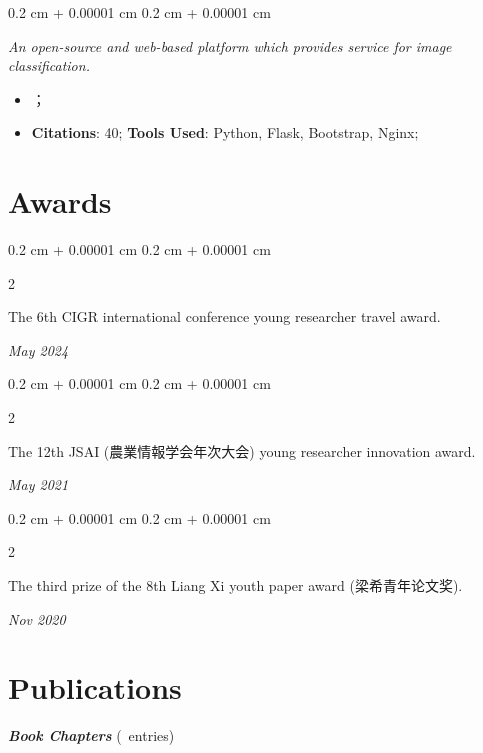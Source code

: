 \documentclass[10pt, a4paper]{article}
\newcommand{\textchinese}[1]{{\CJKfamily{chinese}#1}}
\newcounter{bookchapcount}
\newenvironment{highlights}{
    \begin{itemize}[
        topsep=0.10 cm,
        parsep=0.10 cm,
        partopsep=0pt,
        itemsep=0pt,
        leftmargin=0.4 cm + 10pt
    ]
}{
    \end{itemize}
} %
\newenvironment{onecolentry}{
    \begin{adjustwidth}{
        0.2 cm + 0.00001 cm
    }{
        0.2 cm + 0.00001 cm
    }
}{
    \end{adjustwidth}
} %
\newenvironment{twocolentry}[2][]{
    \onecolentry
    \def\secondColumn{#2}
    \setcolumnwidth{\fill, 4.5 cm}
    \begin{paracol}{2}
}{
    \switchcolumn \raggedleft \secondColumn
    \end{paracol}
    \endonecolentry
} %
\begin{document}
        \vspace{0.10 cm}
        \begin{onecolentry}
            \textit{An open-source and web-based platform which provides service for image classification.}
            
            \begin{highlights}
                \item {}；
                \item \textbf{Citations}: 40; \textbf{Tools Used}: Python, Flask, Bootstrap, Nginx; 
            \end{highlights}
        \end{onecolentry}

    \section{Awards}

        \begin{twocolentry}{
            \textit{May 2024}}
            The 6th CIGR international conference young researcher travel award.
        \end{twocolentry}

        \vspace{0.10 cm}

        \begin{twocolentry}{
            \textit{May 2021}}
            The 12th JSAI (農業情報学会年次大会) young researcher innovation award.
        \end{twocolentry}

        \vspace{0.10 cm}

        \begin{twocolentry}{
            \textit{Nov 2020}}
            The third prize of the 8th Liang Xi youth paper award (\textchinese{梁希青年论文奖}).
        \end{twocolentry}
        
    
    \section{Publications}
        \nocite{*}

        \vspace{0.10 cm}
        \textbf{\textit{Book Chapters}} (\thebookchapcount\ entries)
        \printbibliography[type=incollection, heading=none] %
\end{document}
